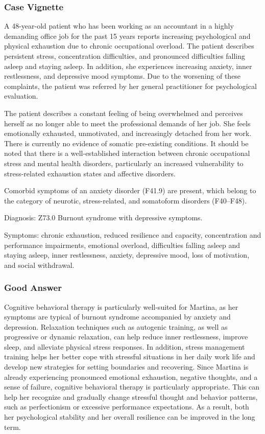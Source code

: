 \subsubsection{Case Vignette}
A 48-year-old patient who has been working as an accountant in a highly demanding office job for the past 15 years reports increasing psychological and physical exhaustion due to chronic occupational overload.
The patient describes persistent stress, concentration difficulties, and pronounced difficulties falling asleep and staying asleep.
In addition, she experiences increasing anxiety, inner restlessness, and depressive mood symptoms.
Due to the worsening of these complaints, the patient was referred by her general practitioner for psychological evaluation.

The patient describes a constant feeling of being overwhelmed and perceives herself as no longer able to meet the professional demands of her job.
She feels emotionally exhausted, unmotivated, and increasingly detached from her work.
There is currently no evidence of somatic pre-existing conditions.
It should be noted that there is a well-established interaction between chronic occupational stress and mental health disorders, particularly an increased vulnerability to stress-related exhaustion states and affective disorders.

Comorbid symptoms of an anxiety disorder (F41.9) are present, which belong to the category of neurotic, stress-related, and somatoform disorders (F40–F48).

Diagnosis: Z73.0 Burnout syndrome with depressive symptoms.

Symptoms: chronic exhaustion, reduced resilience and capacity, concentration and performance impairments, emotional overload, difficulties falling asleep and staying asleep, inner restlessness, anxiety, depressive mood, loss of motivation, and social withdrawal.
\subsubsection{Good Answer}
Cognitive behavioral therapy is particularly well-suited for Martina, as her symptoms are typical of burnout syndrome accompanied by anxiety and depression.
Relaxation techniques such as autogenic training, as well as progressive or dynamic relaxation, can help reduce inner restlessness, improve sleep, and alleviate physical stress responses.
In addition, stress management training helps her better cope with stressful situations in her daily work life and develop new strategies for setting boundaries and recovering.
Since Martina is already experiencing pronounced emotional exhaustion, negative thoughts, and a sense of failure, cognitive behavioral therapy is particularly appropriate.
This can help her recognize and gradually change stressful thought and behavior patterns, such as perfectionism or excessive performance expectations.
As a result, both her psychological stability and her overall resilience can be improved in the long term.
